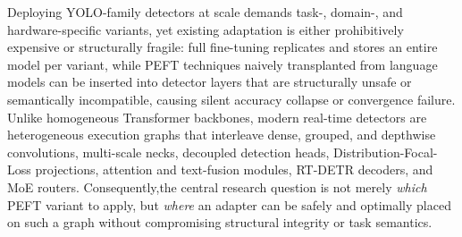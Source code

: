 {%

Deploying YOLO-family detectors at scale demands task-, domain-, and
hardware-specific variants, yet existing adaptation is either prohibitively expensive or structurally fragile: full fine-tuning replicates and stores an entire model per variant, while PEFT techniques naively transplanted from language models can be inserted into detector layers that are structurally unsafe or semantically incompatible, causing silent accuracy collapse or convergence failure. Unlike homogeneous Transformer backbones, modern real-time detectors are heterogeneous execution graphs that interleave dense, grouped, and depthwise convolutions, multi-scale necks, decoupled detection heads, Distribution-Focal-Loss projections, attention and text-fusion modules, RT-DETR decoders, and MoE routers. Consequently,the central research question is not merely \emph{which} PEFT variant to apply, but \emph{where} an adapter can be safely and optimally placed on such a graph without compromising structural integrity or task semantics.

}
